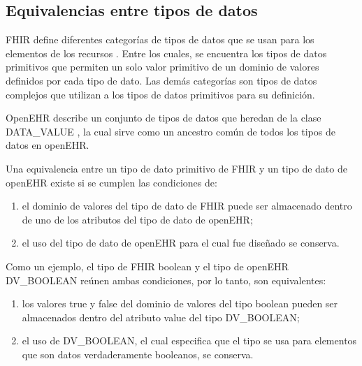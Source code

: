 \subsection{Equivalencias entre tipos de datos}

FHIR define diferentes categorías de tipos de datos que se usan para los elementos de los recursos \cite{FHIRDataTypes}. Entre los cuales, se encuentra los tipos de datos primitivos que permiten un solo valor primitivo de un dominio de valores definidos por cada tipo de dato. Las demás categorías son tipos de datos complejos que utilizan a los tipos de datos primitivos para su definición.

OpenEHR describe un conjunto de tipos de datos que heredan de la clase DATA\_VALUE \cite{openEHRDataTypes}, la cual sirve como un ancestro común de todos los tipos de datos en openEHR.

Una equivalencia entre un tipo de dato primitivo de FHIR y un tipo de dato de openEHR existe si se cumplen las condiciones de:

\begin{enumerate}
  \item el dominio de valores del tipo de dato de FHIR puede ser almacenado dentro de uno de los atributos del tipo de dato de openEHR;
  \item el uso del tipo de dato de openEHR para el cual fue diseñado se conserva.
\end{enumerate}

Como un ejemplo, el tipo de FHIR boolean y el tipo de openEHR DV\_BOOLEAN reúnen ambas condiciones, por lo tanto, son equivalentes:
\begin{enumerate}
  \item los valores true y false del dominio de valores del tipo boolean pueden ser almacenados dentro del atributo value del tipo DV\_BOOLEAN;
  \item el uso de DV\_BOOLEAN, el cual especifica que el tipo se usa para elementos que son datos verdaderamente booleanos, se conserva.
\end{enumerate}

